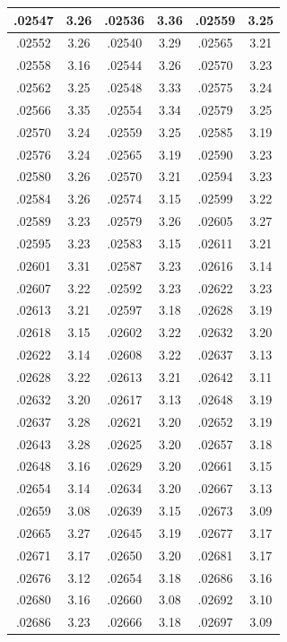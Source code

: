 \documentclass[11pt]{report}
\begin{document}
\begin{appendices}
\begin{longtable}{|c|c||c|c||c|c|}
.02547 & 3.26 & .02536 & 3.36 & .02559 & 3.25\\\hline
.02552 & 3.26 & .02540 & 3.29 & .02565 & 3.21\\\hline
.02558 & 3.16 & .02544 & 3.26 & .02570 & 3.23\\\hline
.02562 & 3.25 & .02548 & 3.33 & .02575 & 3.24\\\hline
.02566 & 3.35 & .02554 & 3.34 & .02579 & 3.25\\\hline
.02570 & 3.24 & .02559 & 3.25 & .02585 & 3.19\\\hline
.02576 & 3.24 & .02565 & 3.19 & .02590 & 3.23\\\hline
.02580 & 3.26 & .02570 & 3.21 & .02594 & 3.23\\\hline
.02584 & 3.26 & .02574 & 3.15 & .02599 & 3.22\\\hline
.02589 & 3.23 & .02579 & 3.26 & .02605 & 3.27\\\hline
.02595 & 3.23 & .02583 & 3.15 & .02611 & 3.21\\\hline
.02601 & 3.31 & .02587 & 3.23 & .02616 & 3.14\\\hline
.02607 & 3.22 & .02592 & 3.23 & .02622 & 3.23\\\hline
.02613 & 3.21 & .02597 & 3.18 & .02628 & 3.19\\\hline
.02618 & 3.15 & .02602 & 3.22 & .02632 & 3.20\\\hline
.02622 & 3.14 & .02608 & 3.22 & .02637 & 3.13\\\hline
.02628 & 3.22 & .02613 & 3.21 & .02642 & 3.11\\\hline
.02632 & 3.20 & .02617 & 3.13 & .02648 & 3.19\\\hline
.02637 & 3.28 & .02621 & 3.20 & .02652 & 3.19\\\hline
.02643 & 3.28 & .02625 & 3.20 & .02657 & 3.18\\\hline
.02648 & 3.16 & .02629 & 3.20 & .02661 & 3.15\\\hline
.02654 & 3.14 & .02634 & 3.20 & .02667 & 3.13\\\hline
.02659 & 3.08 & .02639 & 3.15 & .02673 & 3.09\\\hline
.02665 & 3.27 & .02645 & 3.19 & .02677 & 3.17\\\hline
.02671 & 3.17 & .02650 & 3.20 & .02681 & 3.17\\\hline
.02676 & 3.12 & .02654 & 3.18 & .02686 & 3.16\\\hline
.02680 & 3.16 & .02660 & 3.08 & .02692 & 3.10\\\hline
.02686 & 3.23 & .02666 & 3.18 & .02697 & 3.09\\\hline

\end{longtable}
\end{appendices}
\end{document}
